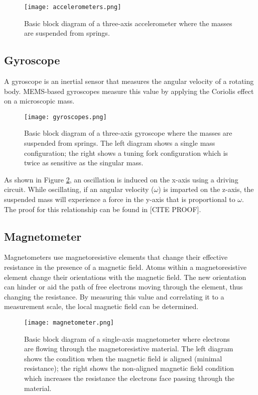 \begin{figure}[h!]
    \caption[Accelerometer block diagram]{Basic block diagram of a three-axis accelerometer where the masses are suspended from springs.}
    \label{fig:accelerometers}
    \centering
    \texttt{[image: accelerometers.png]}
\end{figure}

\subsection{Gyroscope} \label{ssec:bkg_gyroscope}
A gyroscope is an inertial sensor that measures the angular velocity of a rotating body.
MEMS-based gyroscopes measure this value by applying the Coriolis effect on a microscopic mass.

\begin{figure}[h!]
    \caption[Gyroscope block diagram]{Basic block diagram of a three-axis gyroscope where the masses are suspended from springs. The left diagram shows a single mass configuration; the right shows a tuning fork configuration which is twice as sensitive as the singular mass.}
    \label{fig:gyroscopes}
    \centering
    \texttt{[image: gyroscopes.png]}
\end{figure}

As shown in Figure \ref{fig:gyroscopes}, an oscillation is induced on the x-axis using a driving circuit.
While oscillating, if an angular velocity ($\omega$) is imparted on the z-axis, the suspended mass will experience a force in the y-axis that is proportional to $\omega$.
The proof for this relationship can be found in [CITE PROOF].

\subsection{Magnetometer} \label{ssec:bkg_magnetometer}
Magnetometers use magnetoresistive elements that change their effective resistance in the presence of a magnetic field.
Atoms within a magnetoresistive element change their orientations with the magnetic field.
The new orientation can hinder or aid the path of free electrons moving through the element, thus changing the resistance.
By measuring this value and correlating it to a measurement scale, the local magnetic field can be determined.

\begin{figure}[h!]
    \caption[Magnetometer block diagram]{Basic block diagram of a single-axis magnetometer where electrons are flowing through the magnetoresistive material. The left diagram shows the condition when the magnetic field is aligned (minimal resistance); the right shows the non-aligned magnetic field condition which increases the resistance the electrons face passing through the material.}
    \label{fig:magnetometer}
    \centering
    \texttt{[image: magnetometer.png]}
\end{figure}

